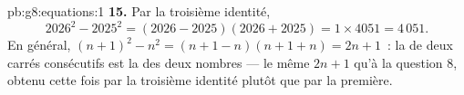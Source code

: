 \begin{solution}{pb:g8:equations:1}
\textbf{15.} Par la troisième identité,
\[
2026^2 - 2025^2 = (2026 - 2025)(2026 + 2025)
= 1 \times 4051 = 4\,051 .
\]
En général, $(n+1)^2 - n^2 = (n + 1 - n)(n + 1 + n) = 2n + 1$~: la
 de deux carrés consécutifs est la  des deux nombres
--- le même $2n + 1$ qu'à la question 8, obtenu cette fois par la
troisième identité plutôt que par la première.
\end{solution}
